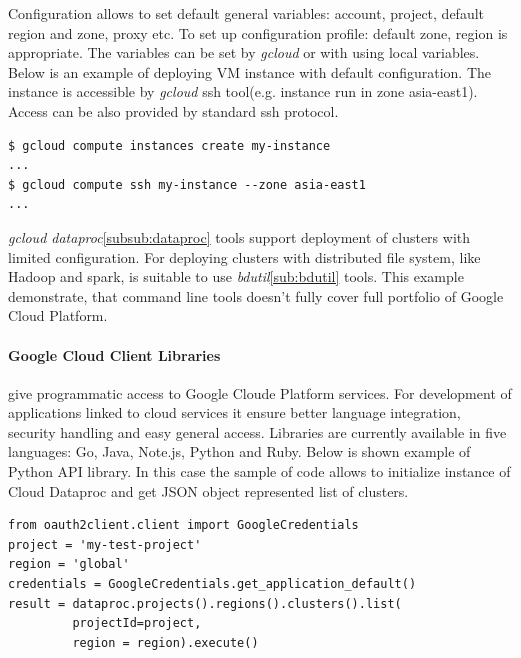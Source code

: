 \documentclass[a4paper,12pt,oneside]{report}
\begin{document}
Configuration allows to set default general variables: account, project, default region 
and zone, proxy etc. To set up configuration profile: default zone, region is appropriate. 
The variables can be set by \textit{gcloud} or with using 
local variables.
Below is an example of deploying VM instance with default configuration. The instance 
is accessible by \textit{gcloud} ssh tool(e.g. instance run in zone asia-east1). Access can be also provided 
by standard ssh protocol.

\begin{footnotesize}
\begin{lstlisting}[style=mybash]
$ gcloud compute instances create my-instance
...
$ gcloud compute ssh my-instance --zone asia-east1
...
\end{lstlisting}\end{footnotesize}
 

\textit{gcloud dataproc}\ref{subsub:dataproc} tools support deployment of clusters with limited configuration. For deploying 
clusters with distributed file system, like Hadoop and spark, is suitable to use \textit{bdutil}\ref{sub:bdutil} tools. 
This example demonstrate, that command line tools doesn’t fully cover full portfolio of Google Cloud Platform. 
   
\paragraph{Google Cloud Client Libraries} give programmatic access to Google Cloude Platform services. For development of applications 
linked to cloud services it ensure better language integration, security handling and easy general access. Libraries are currently 
available in five languages: Go, Java, Note.js, Python and Ruby. Below is shown 
example of Python API library. In this case the sample of code allows to initialize  
instance of Cloud Dataproc and get JSON object represented list of clusters.

\begin{footnotesize}
\begin{lstlisting}[style=python]
from oauth2client.client import GoogleCredentials
project = 'my-test-project'
region = 'global'
credentials = GoogleCredentials.get_application_default()
result = dataproc.projects().regions().clusters().list(
         projectId=project,
         region = region).execute()
\end{lstlisting}\end{footnotesize}
 
\end{document}
